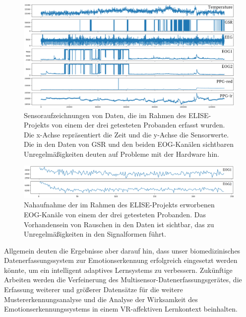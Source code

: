 \begin{figure}[h]
\includegraphics[width=\textwidth]{Images/bad_signals.png} 
\vspace{-0.3cm} \caption[Sensoraufzeichnungen von Daten]{ Sensoraufzeichnungen von Daten, die im Rahmen des ELISE-Projekts von einem der drei getesteten Probanden erfasst wurden. Die x-Achse repr{\"a}sentiert die Zeit und die y-Achse die Sensorwerte. Die in den Daten von GSR und den beiden EOG-Kan{\"a}len sichtbaren Unregelm{\"a}{\ss}igkeiten deuten auf Probleme mit der Hardware hin. }
\label{fig:bad_signals} \end{figure} \vspace{0.5cm}


\begin{figure}[h]
\includegraphics[width=\textwidth]{Images/zoom.png} 
\vspace{-0.3cm} \caption[Nahaufnahme von Rauschen in Daten]{ Nahaufnahme der im Rahmen des ELISE-Projekts erworbenen EOG-Kan{\"a}le von einem der drei getesteten Probanden. Das Vorhandensein von Rauschen in den Daten ist sichtbar, das zu Unregelm{\"a}{\ss}igkeiten in den Signalformen f{\"u}hrt. }
\label{fig:zoom} \end{figure} \vspace{0.5cm}



\newpage

Allgemein deuten die Ergebnisse aber darauf hin, dass unser biomedizinisches Datenerfassungssystem zur Emotionserkennung erfolgreich eingesetzt werden k{\"o}nnte, um ein intelligent adaptives Lernsystems zu verbessern. Zuk{\"u}nftige Arbeiten werden die Verfeinerung des Multisensor-Datenerfassungsger{\"a}tes, die Erfassung weiterer und gr{\"o}{\ss}erer Datens{\"a}tze f{\"u}r die weitere Mustererkennungsanalyse und die Analyse der Wirksamkeit des Emotionserkennungssystems in einem VR-affektiven Lernkontext beinhalten.